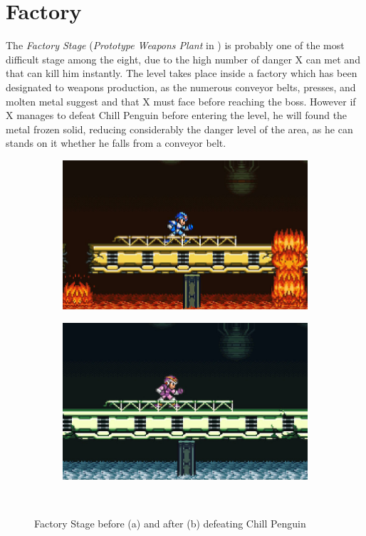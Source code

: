 \chapter{Factory} 
The \textit{Factory Stage} (\textit{Prototype Weapons Plant} in \mhx)  is probably one of the most difficult stage among the eight, due to the high number of danger X can met and that can kill him instantly. The level takes place inside a factory which has been designated to weapons production, as the numerous conveyor belts, presses, and molten metal suggest and that X must face before reaching the boss. However if X manages to defeat Chill Penguin before entering the level, he will found the metal frozen solid, reducing considerably the danger level of the area, as he can stands on it whether he falls from a conveyor belt.
\begin{figure}[h]
	\centering
	\begin{subfigure}{0.49\textwidth}
		\centering
		\includegraphics[width=\linewidth]{figures/X1/Flame_mammoth/Flame_fire.jpg}
		\caption{}
	\end{subfigure}
	\begin{subfigure}{0.465\textwidth}
		\centering
		\includegraphics[width=\linewidth]{figures/X1/Flame_mammoth/Flame_frozen.jpg}
		\caption{}
	\end{subfigure}\\
	\caption{Factory Stage before (a) and after (b)  defeating Chill Penguin}
\end{figure}

